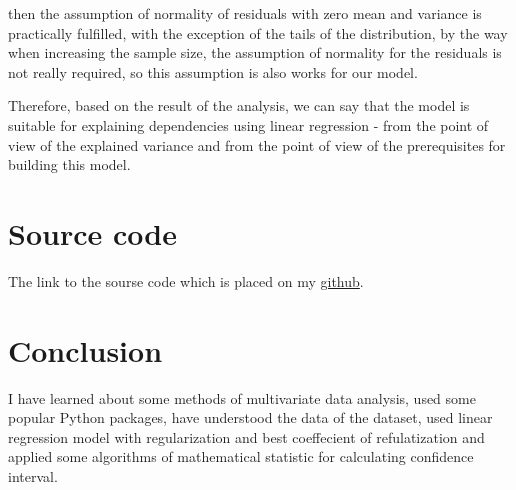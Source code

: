\documentclass[%
12pt, %
final, %
oneside, %
onecolumn, %
centertags]{article} %
\theoremstyle{plain}
\theoremstyle{definition}
\theoremstyle{remark}
\begin{document}
 then the assumption of normality of residuals with zero mean and variance is practically fulfilled, with the exception of the tails of the distribution, by the way when increasing the sample size, the assumption of normality for the residuals is not really required, so this assumption is also works for our model.

Therefore, based on the result of the analysis, we can say that the model is suitable for explaining dependencies using linear regression - from the point of view of the explained variance and from the point of view of the prerequisites for building this model.


\section{Source code}

The link to the sourse code which is placed on my \href{https://github.com/aptmess/MMA/}{github}.

\section{Conclusion}

I have learned about some methods of multivariate data analysis, used some popular Python packages, have understood the data of the dataset, used linear regression model with regularization and best coeffecient of refulatization and applied some algorithms of mathematical statistic for calculating confidence interval. 
\end{document}
